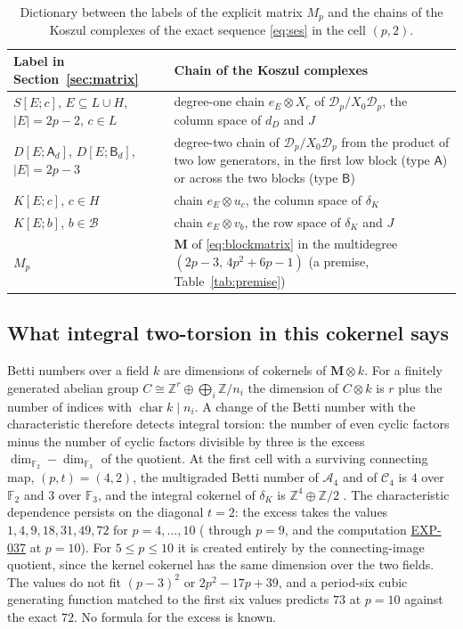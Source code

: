 \documentclass[11pt]{article}
\theoremstyle{definition}
\theoremstyle{remark}
\newcommand{\Z}{\mathbb Z}
\newcommand{\Exp}[2]{\href{https://github.com/fsantibanezleal/CAOS_RESEARCH/tree/main/problems/commutative-algebra/huneke-wiegand/experiments/#1}{#2}}
\begin{document}
\begin{table}[t]
\centering\small
\begin{tabular}{>{\raggedright\arraybackslash}p{}>{\raggedright\arraybackslash}p{}}
\toprule
Label in Section~\ref{sec:matrix} & Chain of the Koszul complexes\\
\midrule
$S[E;c]$, $E\subseteq L\cup H$, $|E|=2p-2$, $c\in L$ &
degree-one chain $e_E\otimes X_c$ of $\mathcal D_p/X_0\mathcal D_p$, the column space of $d_D$ and $J$\\[3pt]
$D[E;\mathsf A_d]$, $D[E;\mathsf B_d]$, $|E|=2p-3$ &
degree-two chain of $\mathcal D_p/X_0\mathcal D_p$ from the product of two low generators, in the first
low block (type $\mathsf A$) or across the two blocks (type $\mathsf B$)\\[3pt]
$K[E;c]$, $c\in H$ & chain $e_E\otimes u_c$, the column space of $\delta_K$\\[3pt]
$K[E;b]$, $b\in\mathcal B$ & chain $e_E\otimes v_b$, the row space of $\delta_K$ and $J$\\[3pt]
$M_p$ & $\mathbf M$ of \eqref{eq:blockmatrix} in the multidegree $(2p-3,\,4p^2+6p-1)$ (a premise, Table~\ref{tab:premise})\\
\bottomrule
\end{tabular}
\caption{Dictionary between the labels of the explicit matrix $M_p$ and the chains of the
Koszul complexes of the exact sequence \eqref{eq:ses} in the cell $(p,2)$.}
\label{tab:dictionary}
\end{table}

\subsection{What integral two-torsion in this cokernel says}

Betti numbers over a field $k$ are dimensions of cokernels of $\mathbf M\otimes k$.
For a finitely generated abelian group $C\cong\Z^r\oplus\bigoplus_i\Z/n_i$
the dimension of $C\otimes k$ is $r$ plus the number of indices with
$\operatorname{char}k\mid n_i$. A change of the Betti number with the
characteristic therefore detects integral torsion: the number of even cyclic
factors minus the number of cyclic factors divisible by three is the excess
$\dim_{\mathbb F_2}-\dim_{\mathbb F_3}$ of the quotient. At the first cell with a
surviving connecting map, $(p,t)=(4,2)$, the multigraded Betti number of
$\mathcal A_4$ and of $\mathcal C_4$ is $4$ over $\mathbb F_2$ and $3$ over
$\mathbb F_3$, and the integral cokernel of $\delta_K$ is $\Z^4\oplus\Z/2$
\cite{CAOSMain}. The characteristic dependence persists on the diagonal $t=2$:
the excess takes the values $1,4,9,18,31,49,72$ for $p=4,\ldots,10$
(\cite{CAOSMain} through $p=9$, and the computation \Exp{EXP-037-connecting-quasipolynomial}{EXP-037}
at $p=10$). For $5\leq p\leq10$ it is created entirely by the connecting-image
quotient, since the kernel cokernel has the same dimension over the two fields.
The values do not fit $(p-3)^2$ or $2p^2-17p+39$, and a period-six cubic
generating function matched to the first six values predicts $73$ at $p=10$
against the exact $72$. No formula for the excess is known.
\end{document}
